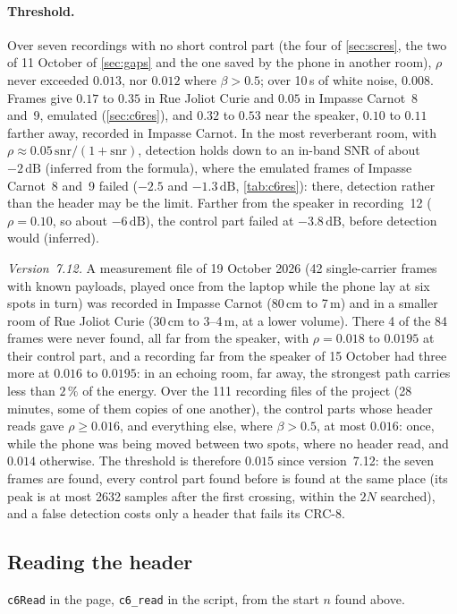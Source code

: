 \documentclass[11pt,a4paper]{article}
\newcommand{\dB}{\,\mathrm{dB}}
\newcommand{\code}[1]{\texttt{#1}}
\theoremstyle{remark}
\begin{document}
\paragraph{Threshold.} Over seven recordings with no short control part (the four of \cref{sec:scres}, the two of 11 October of \cref{sec:gaps} and the one saved by the phone in another room), $\rho$ never exceeded $0.013$, nor $0.012$ where $\beta > 0.5$; over 10\,s of white noise, $0.008$. Frames give $0.17$ to $0.35$ in Rue Joliot Curie and $0.05$ in Impasse Carnot~8 and~9, emulated (\cref{sec:c6res}), and $0.32$ to $0.53$ near the speaker, $0.10$ to $0.11$ farther away, recorded in Impasse Carnot. In the most reverberant room, with $\rho \approx 0.05\, \mathrm{snr}/(1 + \mathrm{snr})$, detection holds down to an in-band SNR of about $-2\dB$ (inferred from the formula), where the emulated frames of Impasse Carnot~8 and~9 failed ($-2.5$ and $-1.3\dB$, \cref{tab:c6res}): there, detection rather than the header may be the limit. Farther from the speaker in recording~12 ($\rho = 0.10$, so about $-6\dB$), the control part failed at $-3.8\dB$, before detection would (inferred).

\emph{Version~7.12.} A measurement file of 19 October 2026 (42 single-carrier frames with known payloads, played once from the laptop while the phone lay at six spots in turn) was recorded in Impasse Carnot (80\,cm to 7\,m) and in a smaller room of Rue Joliot Curie (30\,cm to 3--4\,m, at a lower volume). There 4 of the 84 frames were never found, all far from the speaker, with $\rho = 0.018$ to $0.0195$ at their control part, and a recording far from the speaker of 15 October had three more at $0.016$ to $0.0195$: in an echoing room, far away, the strongest path carries less than $2\,\%$ of the energy. Over the 111 recording files of the project (28 minutes, some of them copies of one another), the control parts whose header reads gave $\rho \ge 0.016$, and everything else, where $\beta > 0.5$, at most $0.016$: once, while the phone was being moved between two spots, where no header read, and $0.014$ otherwise. The threshold is therefore $0.015$ since version~7.12: the seven frames are found, every control part found before is found at the same place (its peak is at most 2632 samples after the first crossing, within the $2N$ searched), and a false detection costs only a header that fails its CRC-8.

\subsection{Reading the header}
\label{sec:c6rx}
\code{c6Read} in the page, \code{c6\_read} in the script, from the start $n$ found above.
\end{document}

